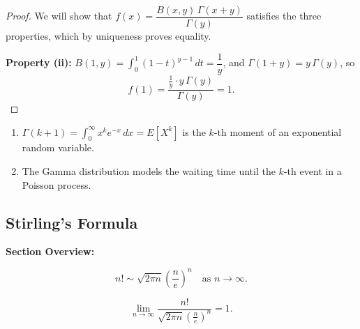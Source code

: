 \documentclass[../master/master.tex]{subfiles}
\begin{document}
\begin{proof}
We will show that $f(x) = \dfrac{B(x,y)\,\Gamma(x+y)}{\Gamma(y)}$ satisfies the three properties, which by uniqueness proves equality.

\textbf{Property (ii):} $B(1,y) = \int_0^1 (1-t)^{y-1}\,dt = \dfrac{1}{y}$, and $\Gamma(1+y) = y\,\Gamma(y)$, so
\[
f(1) = \frac{\frac{1}{y} \cdot y\,\Gamma(y)}{\Gamma(y)} = 1.
\]

\end{proof}

\begin{remark}
\begin{enumerate}
    \item $\Gamma(k+1) = \int_0^\infty x^k e^{-x}\,dx = E[X^k]$ is the $k$-th moment of an exponential random variable.
    \item The Gamma distribution models the waiting time until the $k$-th event in a Poisson process.
\end{enumerate}
\end{remark}

\subsection{Stirling's Formula}

\begin{summarybox}
\textbf{Section Overview:}
\end{summarybox}

\begin{theorem}
\[
n! \sim \sqrt{2\pi n}\left(\frac{n}{e}\right)^n \quad \text{as } n \to \infty.
\]
\end{theorem}

\begin{theorem}
\[
\lim_{n \to \infty} \frac{n!}{\sqrt{2\pi n}\left(\frac{n}{e}\right)^n} = 1.
\]
\end{theorem}
\end{document}
